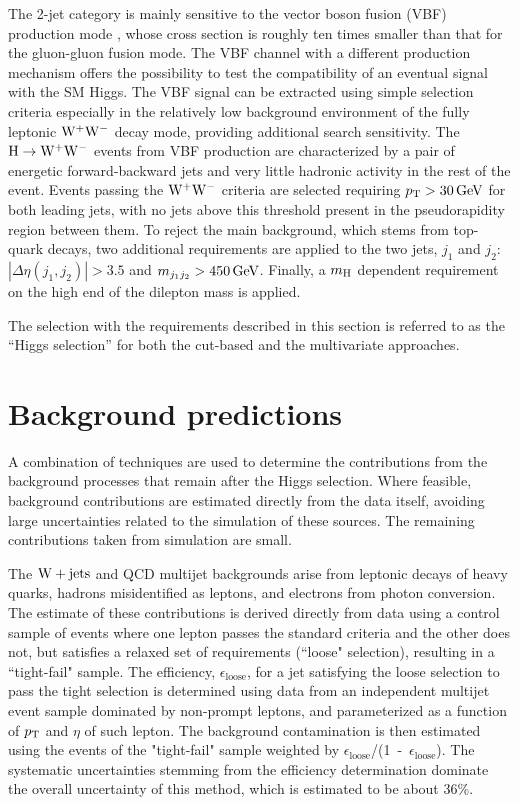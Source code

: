\documentclass[11pt,twoside,a4paper,cmspaper,final,collab]{cms-tdr}
\begin{document}
The 2-jet category is mainly sensitive to the vector boson fusion (VBF) production mode
\cite{Ciccolini:2007jr, Ciccolini:2007ec, Arnold:2008rz}, whose
cross section is roughly ten times smaller than that for the
gluon-gluon fusion mode. The VBF channel with a different production mechanism offers the
possibility to test the compatibility of an eventual signal with the SM Higgs.
The VBF signal can be extracted
using simple selection criteria especially in the relatively low background environment
of the fully leptonic $\mathrm{W^+}{}\mathrm{W^-}$ decay mode, providing additional search sensitivity.
The $\mathrm{H}\to\mathrm{W^+}{}\mathrm{W^-}$ events from VBF production are characterized by a pair of
energetic forward-backward jets and very little hadronic activity in
the rest of the event.
Events passing the $\mathrm{W^+}{}\mathrm{W^-}$ criteria are selected requiring $p_{\mathrm{T}}>30\,\text{Ge\hspace{-.08em}V}$
for both leading jets, with no jets above this threshold
present in the pseudorapidity region between them.
To reject
the main background, which stems from top-quark decays, two additional requirements are applied
to the two jets, $j_1$ and $j_2$: $|\Delta\eta (j_1,j_2)| > 3.5$ and
$m_{j_1j_2} >450\,\text{Ge\hspace{-.08em}V}$. Finally, a $m_{\mathrm{H}}$ dependent requirement on
the high end of the dilepton mass is applied.

The selection with the requirements described in this section is referred to
as the ``Higgs selection'' for both the cut-based and the multivariate approaches.

\section{Background predictions}
\label{sec:backgrounds}

A combination of techniques are used to determine the contributions from the background
processes that remain after the Higgs selection.
Where feasible, background contributions are estimated directly from
the data itself, avoiding large uncertainties related to
the simulation of these sources. The remaining contributions
taken from simulation are small.

The $\mathrm{W}+\mathrm{jets}$ and QCD multijet backgrounds arise from leptonic
decays of heavy quarks, ha\-drons misidentified as leptons, and electrons
from photon conversion. The estimate of these contributions is derived
directly from data using a control sample of events where one lepton
passes the standard criteria and the other does not, but satisfies a
relaxed set of requirements (``loose" selection), resulting in a
``tight-fail" sample.
The efficiency, $\epsilon_\text{loose}$, for a jet satisfying the loose
selection to pass the tight selection is determined using data from an
independent multijet event sample dominated by non-prompt leptons, and
parameterized as a function of $p_{\mathrm{T}}$ and $\eta$ of such lepton. The background
contamination is then estimated using the events of the "tight-fail"
sample weighted by \mbox{$\epsilon_\text{loose}$/(1 - $\epsilon_\text{loose}$)}. The
systematic uncertainties stemming from the efficiency determination
dominate the overall uncertainty of this method, which is estimated
to be about 36\%.
\end{document}
